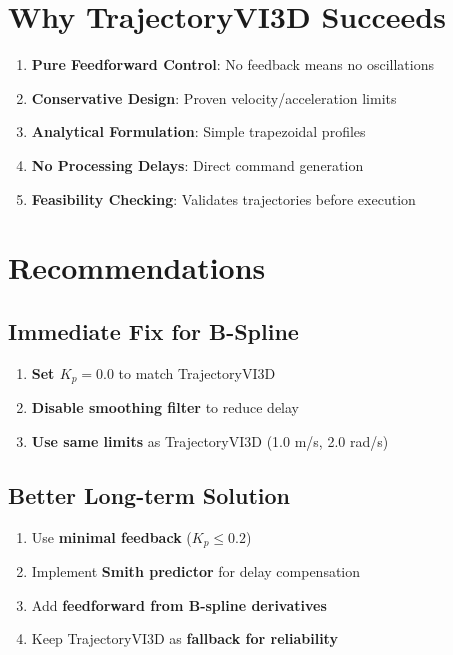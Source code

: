 \documentclass[12pt,a4paper]{article}
\begin{document}
\section{Why TrajectoryVI3D Succeeds}

\begin{enumerate}
    \item \textbf{Pure Feedforward Control}: No feedback means no oscillations
    \item \textbf{Conservative Design}: Proven velocity/acceleration limits
    \item \textbf{Analytical Formulation}: Simple trapezoidal profiles
    \item \textbf{No Processing Delays}: Direct command generation
    \item \textbf{Feasibility Checking}: Validates trajectories before execution
\end{enumerate}

\section{Recommendations}

\subsection{Immediate Fix for B-Spline}

\begin{enumerate}
    \item \textbf{Set $K_p = 0.0$} to match TrajectoryVI3D
    \item \textbf{Disable smoothing filter} to reduce delay
    \item \textbf{Use same limits} as TrajectoryVI3D (1.0 m/s, 2.0 rad/s)
\end{enumerate}

\subsection{Better Long-term Solution}

\begin{enumerate}
    \item Use \textbf{minimal feedback} ($K_p \leq 0.2$)
    \item Implement \textbf{Smith predictor} for delay compensation
    \item Add \textbf{feedforward from B-spline derivatives}
    \item Keep TrajectoryVI3D as \textbf{fallback for reliability}
\end{enumerate}
\end{document}
